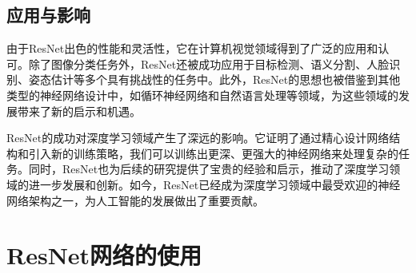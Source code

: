 \subsection{应用与影响}

由于ResNet出色的性能和灵活性，它在计算机视觉领域得到了广泛的应用和认可。除了图像分类任务外，ResNet还被成功应用于目标检测、语义分割、人脸识别、姿态估计等多个具有挑战性的任务中。此外，ResNet的思想也被借鉴到其他类型的神经网络设计中，如循环神经网络和自然语言处理等领域，为这些领域的发展带来了新的启示和机遇。

ResNet的成功对深度学习领域产生了深远的影响。它证明了通过精心设计网络结构和引入新的训练策略，我们可以训练出更深、更强大的神经网络来处理复杂的任务。同时，ResNet也为后续的研究提供了宝贵的经验和启示，推动了深度学习领域的进一步发展和创新。如今，ResNet已经成为深度学习领域中最受欢迎的神经网络架构之一，为人工智能的发展做出了重要贡献。

\section{ResNet网络的使用}